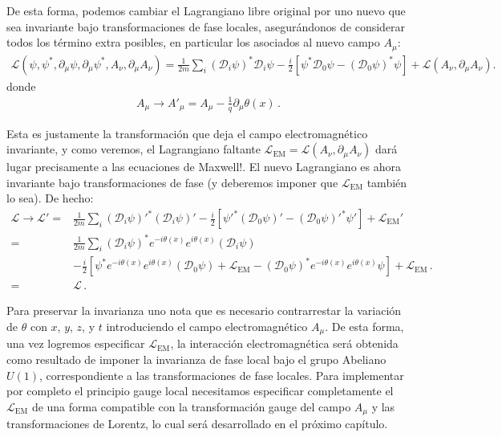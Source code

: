 \begin{frame}
De esta forma, podemos cambiar el Lagrangiano libre original por uno nuevo que sea invariante bajo transformaciones de fase locales, asegurándonos de considerar todos los término extra posibles, en particular los asociados al nuevo campo $A_{\mu}$:
\begin{align}
   \mathcal{L}(\psi,\psi^*,\partial_\mu\psi,\partial_\mu\psi^*,A_\nu,\partial_{\mu} A_{\nu} )
=\frac{1}{2m}\sum_i\left(\mathcal{D}_i\psi\right)^*\mathcal{D}_i\psi-\frac{i}{2}
  \left[\psi^*\mathcal{D}_0\psi-\left(\mathcal{D}_0\psi\right)^*\psi\right]+\mathcal{L}\left( A_{\nu},\partial_{\mu} A_{\nu} \right).
\end{align}
donde
\begin{align}
\label{eq:167qft}
  A_\mu\to A'_\mu=A_\mu-\frac{1}{q}\partial_\mu\theta(x)\,.
\end{align}
\end{frame}
Esta es justamente la transformación que deja el campo electromagnético invariante, y como veremos, el Lagrangiano faltante $\mathcal{L}_{\text{EM}}=\mathcal{L}\left( A_{\nu},\partial_{\mu} A_{\nu} \right)$ dará lugar precisamente a las ecuaciones de Maxwell!. El nuevo Lagrangiano es ahora invariante bajo transformaciones de fase (y deberemos imponer que $\mathcal{L}_{\text{EM}}$ también lo sea). De hecho:
\begin{align}
  \mathcal{L}\to \mathcal{L}'=&
\frac{1}{2m}\sum_i{\left(\mathcal{D}_i\psi\right)'}^*\left(\mathcal{D}_i\psi\right)'
-\frac{i}{2}\left[{\psi'}^*\left(\mathcal{D}_0\psi\right)'-{\left(\mathcal{D}_0\psi\right)'}^*\psi'\right]+\mathcal{L}_{\text{EM}}'\nonumber\\
=&
\frac{1}{2m}\sum_i{\left(\mathcal{D}_i\psi\right)}^*e^{-i\theta(x)}e^{i\theta(x)}\left(\mathcal{D}_i\psi\right)\nonumber\\
&-\frac{i}{2}\left[{\psi}^*e^{-i\theta(x)}e^{i\theta(x)}\left(\mathcal{D}_0\psi\right)+\mathcal{L}_{\text{EM}}
-{\left(\mathcal{D}_0\psi\right)}^*e^{-i\theta(x)}e^{i\theta(x)}\psi\right]+\mathcal{L}_{\text{EM}}\,.\nonumber\\
=&\mathcal{L}\,.
\end{align}

Para preservar la invarianza uno nota que es necesario contrarrestar la variación de  $\theta$ con $x$, $y$, $z$, y $t$ 
introduciendo el campo electromagnético  $A_\mu$. De esta forma, una vez logremos especificar $\mathcal{L}_{\text{EM}}$, la interacción electromagnética será obtenida como resultado de imponer la invarianza de fase local bajo el grupo Abeliano  $U(1)$, correspondiente a las transformaciones de fase locales. Para implementar por completo el principio gauge local necesitamos especificar completamente el $\mathcal{L}_{\text{EM}}$ de una forma compatible con la transformación gauge del campo $A_{\mu}$ y las transformaciones de Lorentz, lo cual será desarrollado en el próximo capítulo. 

